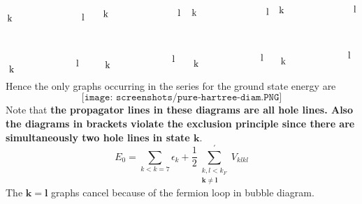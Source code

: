 \begin{equation}
\begin{tikzpicture}[x=0.65pt,y=0.65pt,yscale=-1,xscale=1]
\draw (46.35,574.51) node [anchor=north west][inner sep=0.75pt]  [rotate=-0.74] [align=left] {k};
\draw (43.41,492.46) node [anchor=north west][inner sep=0.75pt]  [rotate=-0.74] [align=left] {k};
\draw (154.01,564.81) node [anchor=north west][inner sep=0.75pt]  [rotate=-0.74] [align=left] {l};
\draw (162.97,490.91) node [anchor=north west][inner sep=0.75pt]  [rotate=-0.74] [align=left] {l};
\draw (200.35,567.51) node [anchor=north west][inner sep=0.75pt]  [rotate=-0.74] [align=left] {k};
\draw (197.41,485.46) node [anchor=north west][inner sep=0.75pt]  [rotate=-0.74] [align=left] {k};
\draw (308.01,557.81) node [anchor=north west][inner sep=0.75pt]  [rotate=-0.74] [align=left] {l};
\draw (316.97,483.91) node [anchor=north west][inner sep=0.75pt]  [rotate=-0.74] [align=left] {l};
\draw (482.35,561.51) node [anchor=north west][inner sep=0.75pt]  [rotate=-0.74] [align=left] {k};
\draw (479.41,479.46) node [anchor=north west][inner sep=0.75pt]  [rotate=-0.74] [align=left] {k};
\draw (590.01,551.81) node [anchor=north west][inner sep=0.75pt]  [rotate=-0.74] [align=left] {l};
\draw (598.97,477.91) node [anchor=north west][inner sep=0.75pt]  [rotate=-0.74] [align=left] {l};
\draw (342.35,565.51) node [anchor=north west][inner sep=0.75pt]  [rotate=-0.74] [align=left] {k};
\draw (339.41,483.46) node [anchor=north west][inner sep=0.75pt]  [rotate=-0.74] [align=left] {k};
\draw (450.01,555.81) node [anchor=north west][inner sep=0.75pt]  [rotate=-0.74] [align=left] {l};
\draw (458.97,481.91) node [anchor=north west][inner sep=0.75pt]  [rotate=-0.74] [align=left] {l};


\end{tikzpicture}
\end{equation}
Hence the only graphs occurring in the series for the ground state energy are 
\begin{equation}
    \texttt{[image: screenshots/pure-hartree-diam.PNG]}
    \label{pure-hartree-diam}
\end{equation}
Note that \textbf{the propagator lines in these diagrams are all hole lines. Also the diagrams in brackets violate the exclusion principle since there are simultaneously two hole lines in state $\mathbf{k}$}.
\begin{equation}E_{0}=\sum_{k<k=7} \epsilon_{k}+\frac{1}{2} \sum_{\substack{k, l<k_F\\\mathbf{k}\neq\mathbf{l}}}^{\prime} V_{k l k l}\end{equation}
The $\mathbf{k=l}$ graphs cancel because of the fermion loop in bubble diagram.

